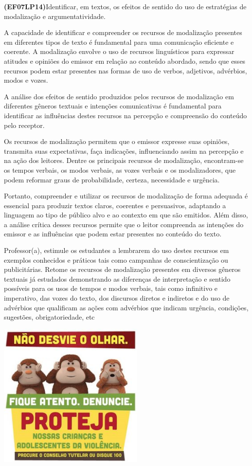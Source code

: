 {\textbf{(EF07LP14)}Identificar, em textos, os efeitos de sentido do uso
de estratégias de modalização e argumentatividade.

A capacidade de identificar e compreender os recursos de modalização
presentes em diferentes tipos de texto é fundamental para uma
comunicação eficiente e coerente. A modalização envolve o uso de
recursos linguísticos para expressar atitudes e opiniões do emissor em
relação ao conteúdo abordado, sendo que esses recursos podem estar
presentes nas formas de uso de verbos, adjetivos, advérbios, modos e
vozes.

A análise dos efeitos de sentido produzidos pelos recursos de
modalização em diferentes gêneros textuais e intenções comunicativas é
fundamental para identificar as influências destes recursos na percepção
e compreensão do conteúdo pelo receptor.

Os recursos de modalização permitem que o emissor expresse suas
opiniões, transmita suas expectativas, faça indicações, influenciando
assim na percepção e na ação dos leitores. Dentre os principais recursos
de modalização, encontram-se os tempos verbais, os modos verbais, as
vozes verbais e os modalizadores, que podem reformar graus de
probabilidade, certeza, necessidade e urgência.

Portanto, compreender e utilizar os recursos de modalização de forma
adequada é essencial para produzir textos claros, coerentes e
persuasivos, adaptando a linguagem ao tipo de público alvo e ao contexto
em que são emitidos. Além disso, a análise crítica desses recursos
permite que o leitor compreenda as intenções do emissor e as influências
que podem estar presentes no conteúdo do texto.

Professor(a), estimule os estudantes a lembrarem do uso destes recursos
em exemplos conhecidos e práticos tais como campanhas de conscientização
ou publicitárias. Retome os recursos de modalização presentes em
diversos gêneros textuais já estudados demonstrando as diferenças de
interpretação e sentido possíveis para os usos de tempos e modos
verbais, tais como infinitivo e imperativo, das vozes do texto, dos
discursos diretos e indiretos e do uso de advérbios que qualificam as
ações com advérbios que indicam urgência, condições, sugestões,
obrigatoriedade, etc


\includegraphics[width=2.85536in,height=2.85536in]{./imgSAEB_7_POR/media/image9.png}

}
